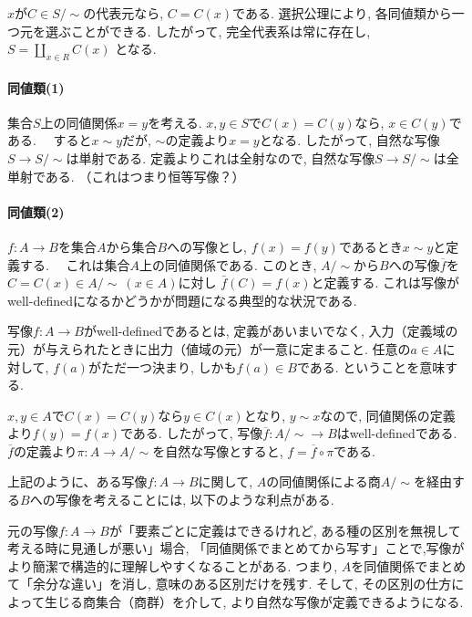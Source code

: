 $x$が$C\in S/\sim$の代表元なら, $C=C(x)$である.
選択公理により, 各同値類から一つ元を選ぶことができる.
したがって, 完全代表系は常に存在し,
	$S=\coprod_{x \in R}C(x)$ となる. \newline
\paragraph*{同値類(1)}
集合$S$上の同値関係$x=y$を考える. $x,y \in S$で$C(x)=C(y)$なら, $x \in C(y)$である.　
すると$x\sim y$だが, $\sim$の定義より$x =y$となる. 
したがって, 自然な写像$S\to S/\sim$は単射である. 
定義よりこれは全射なので, 自然な写像$S\to S/\sim$は全単射である.
（これはつまり恒等写像？）\newline

\paragraph*{同値類(2)}
$f:A\to B$を集合$A$から集合$B$への写像とし, $f(x)=f(y)$であるとき$x \sim y$と定義する.　
これは集合$A$上の同値関係である.
このとき, $A/\sim$から$B$への写像$\overline{f}$を$C=C(x)\in A/\sim \: (x \in A)$に対し
$\bar{f}(C)=f(x)$と定義する.
これは写像がwell-definedになるかどうかが問題になる典型的な状況である.\newline

写像$f:A \to B$がwell-definedであるとは, 定義があいまいでなく,
入力（定義域の元）が与えられたときに出力（値域の元）が一意に定まること.
任意の$a \in A$に対して, $f(a)$がただ一つ決まり, しかも$f(a) \in B$である.
ということを意味する.\newline

$x,y \in A$で$C(x)=C(y)$なら$y \in C(x)$となり, $y\sim x$なので,
同値関係の定義より$f(y)=f(x)$である.
したがって, 写像$\overline{f}:A/\sim\to B$はwell-definedである.
$\overline{f}$の定義より$\pi:A\to A/\sim$を自然な写像とすると,
$f=\overline{f}\circ \pi$である.\newline

上記のように、ある写像$f:A\to B$に関して,
$A$の同値関係による商$A/\sim$を経由する$B$への写像を考えることには, 以下のような利点がある.
 
元の写像$f:A\to B$が「要素ごとに定義はできるけれど, ある種の区別を無視して考える時に見通しが悪い」場合, 
「同値関係でまとめてから写す」ことで,写像がより簡潔で構造的に理解しやすくなることがある.
つまり, $A$を同値関係でまとめて「余分な違い」を消し, 意味のある区別だけを残す.
そして, その区別の仕方によって生じる商集合（商群）を介して,
より自然な写像が定義できるようになる.

